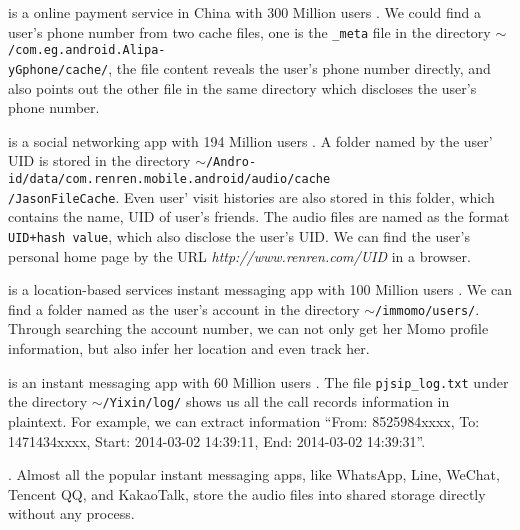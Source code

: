 \documentclass{sig-alternate}
\begin{document}
\vspace{2pt} is a online payment service in China with 300 Million users \cite{Alipayusers}. We could find a user's phone number from two cache files, one is the \texttt{\_meta} file in the directory \texttt{$\sim$/com.eg.android.Alipa-\\yGphone/cache/}, the file content reveals the user's phone number directly, and also points out the other file in the same directory which discloses the user's phone number.



\vspace{2pt} is a social networking app with 194 Million users \cite{Renrenusers}. A folder named by the user' UID is stored in the directory \texttt{$\sim$/Andro-\\id/data/com.renren.mobile.android/audio/cache\\/JasonFileCache}. Even user' visit histories are also stored in this folder, which contains the name, UID of user's friends. The audio files are named as the format \texttt{UID+hash value}, which also disclose the user's UID. We can find the user's personal home page by the URL \textit{http://www.renren.com/UID} in a browser.

\vspace{2pt} is a location-based services instant messaging app with 100 Million users \cite{Momousers}. We can find a folder named as the user's account in the directory \texttt{$\sim$/immomo/users/}. Through searching the account number, we can not only get her Momo profile information, but also infer her location and even track her.

\vspace{2pt} is an instant messaging app with 60 Million users \cite{Yixinusers}. The file \texttt{pjsip\_log.txt} under the directory \texttt{$\sim$/Yixin/log/} shows us all the call records information in plaintext. For example, we can extract information ``From: 8525984xxxx, To: 1471434xxxx, Start: 2014-03-02 14:39:11, End: 2014-03-02 14:39:31''.

\vspace{2pt}. Almost all the popular instant messaging apps, like WhatsApp, Line, WeChat, Tencent QQ, and KakaoTalk, store the audio files into shared storage directly without any process.
\end{document}
